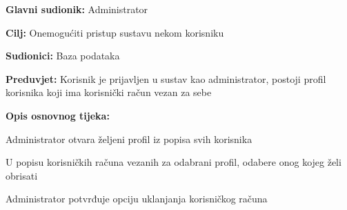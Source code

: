 			
			\noindent {}
			\begin{packed_item}
				
				\item \textbf{Glavni sudionik: }Administrator
				\item  \textbf{Cilj:} Onemogućiti pristup sustavu nekom korisniku
				\item  \textbf{Sudionici:} Baza podataka
				\item  \textbf{Preduvjet:} Korisnik je prijavljen u sustav kao administrator, postoji profil korisnika koji ima korisnički račun vezan za sebe
				\item  \textbf{Opis osnovnog tijeka:}
				
				\item[] \begin{packed_enum}
					
					\item Administrator otvara željeni profil iz popisa svih korisnika
					\item U popisu korisničkih računa vezanih za odabrani profil, odabere onog kojeg želi obrisati
					\item Administrator potvrđuje opciju uklanjanja korisničkog računa
										
				\end{packed_enum}
				
			\end{packed_item}
		
